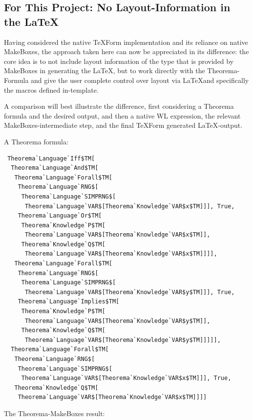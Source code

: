 \subsection{For This Project: No Layout-Information in the \LaTeX} \label{concept:our-approach}

Having considered the native TeXForm implementation and its reliance on native MakeBoxes, the approach taken here can now be appreciated in its difference: the core idea is to not include layout information of the type that is provided by MakeBoxes in generating the \LaTeX, but to work directly with the Theorema-Formula and give the user complete control over layout via \LaTeX and specifically the macros defined in-template.

A comparison will best illustrate the difference, first considering a Theorema formula and the desired output, and then a native WL expression, the relevant MakeBoxes-intermediate step, and the final TeXForm generated \LaTeX-output.

A Theorema formula:

\begin{verbatim}
 Theorema`Language`Iff$TM[
  Theorema`Language`And$TM[
   Theorema`Language`Forall$TM[
    Theorema`Language`RNG$[
     Theorema`Language`SIMPRNG$[
      Theorema`Language`VAR$[Theorema`Knowledge`VAR$x$TM]]], True, 
    Theorema`Language`Or$TM[
     Theorema`Knowledge`P$TM[
      Theorema`Language`VAR$[Theorema`Knowledge`VAR$x$TM]], 
     Theorema`Knowledge`Q$TM[
      Theorema`Language`VAR$[Theorema`Knowledge`VAR$x$TM]]]], 
   Theorema`Language`Forall$TM[
    Theorema`Language`RNG$[
     Theorema`Language`SIMPRNG$[
      Theorema`Language`VAR$[Theorema`Knowledge`VAR$y$TM]]], True, 
    Theorema`Language`Implies$TM[
     Theorema`Knowledge`P$TM[
      Theorema`Language`VAR$[Theorema`Knowledge`VAR$y$TM]], 
     Theorema`Knowledge`Q$TM[
      Theorema`Language`VAR$[Theorema`Knowledge`VAR$y$TM]]]]], 
  Theorema`Language`Forall$TM[
   Theorema`Language`RNG$[
    Theorema`Language`SIMPRNG$[
     Theorema`Language`VAR$[Theorema`Knowledge`VAR$x$TM]]], True, 
   Theorema`Knowledge`Q$TM[
    Theorema`Language`VAR$[Theorema`Knowledge`VAR$x$TM]]]]
\end{verbatim}

The Theorema-MakeBoxes result:

